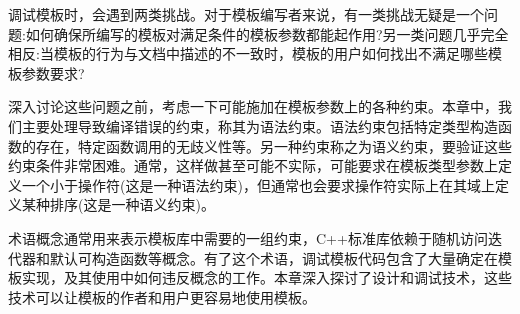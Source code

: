 调试模板时，会遇到两类挑战。对于模板编写者来说，有一类挑战无疑是一个问题:如何确保所编写的模板对满足条件的模板参数都能起作用?另一类问题几乎完全相反:当模板的行为与文档中描述的不一致时，模板的用户如何找出不满足哪些模板参数要求?

深入讨论这些问题之前，考虑一下可能施加在模板参数上的各种约束。本章中，我们主要处理导致编译错误的约束，称其为语法约束。语法约束包括特定类型构造函数的存在，特定函数调用的无歧义性等。另一种约束称之为语义约束，要验证这些约束条件非常困难。通常，这样做甚至可能不实际，可能要求在模板类型参数上定义一个小于操作符(这是一种语法约束)，但通常也会要求操作符实际上在其域上定义某种排序(这是一种语义约束)。

术语概念通常用来表示模板库中需要的一组约束，C++标准库依赖于随机访问迭代器和默认可构造函数等概念。有了这个术语，调试模板代码包含了大量确定在模板实现，及其使用中如何违反概念的工作。本章深入探讨了设计和调试技术，这些技术可以让模板的作者和用户更容易地使用模板。